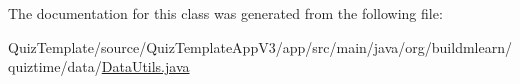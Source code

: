 The documentation for this class was generated from the following file\+:\begin{DoxyCompactItemize}
\item 
Quiz\+Template/source/\+Quiz\+Template\+App\+V3/app/src/main/java/org/buildmlearn/quiztime/data/\hyperlink{QuizTemplate_2source_2QuizTemplateAppV3_2app_2src_2main_2java_2org_2buildmlearn_2quiztime_2data_2DataUtils_8java}{Data\+Utils.\+java}\end{DoxyCompactItemize}
